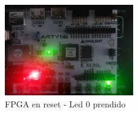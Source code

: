 \newpage

\begin{figure}[H]
    \centering
    \includegraphics[width=0.5\textwidth]{captures/fpga_reset.png}
    \caption{FPGA en reset - Led 0 prendido}
\end{figure}

